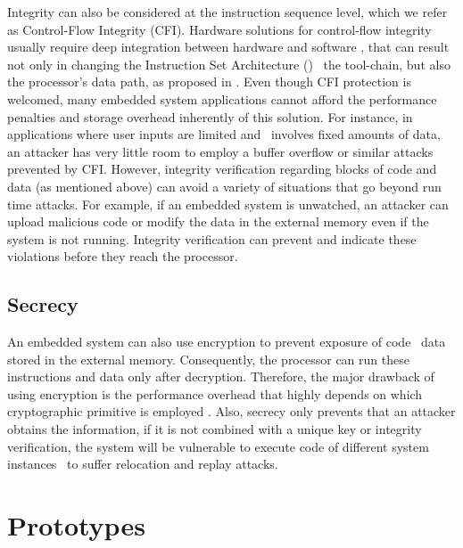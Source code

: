Integrity can also be considered at the instruction sequence level, which we refer as Control-Flow Integrity (CFI). Hardware solutions for control-flow integrity usually require deep integration between hardware and software \cite{Davi2015:HAFIX}, that can result not only in changing the Instruction Set Architecture (\isa) \andor~the tool-chain, but also the processor's data path, as proposed in \cite{Gelbart2005:CODESSEAL, Kanuparthi2012:DynamicIntegrity}. Even though CFI protection is welcomed, many embedded system applications cannot afford the performance penalties and storage overhead inherently of this solution. For instance, in applications where user inputs are limited and \io~involves fixed amounts of data, an attacker has very little room to employ a buffer overflow or similar attacks prevented by CFI. However, integrity verification regarding blocks of code and data (as mentioned above) can avoid a variety of situations that go beyond run time attacks. For example, if an embedded system is unwatched, an attacker can upload malicious code or modify the data in the external memory even if the system is not running. Integrity verification can prevent and indicate these violations before they reach the processor.


\subsection{Secrecy}
\label{subsec:Secrecy}

An embedded system can also use encryption to prevent exposure of code \andor~data stored in the external memory. Consequently, the processor can run these instructions and data only after decryption. Therefore, the major drawback of using encryption is the performance overhead that highly depends on which cryptographic primitive is employed \cite{Suh2007:PUFs}. Also, secrecy only prevents that an attacker obtains the information, if it is not combined with a unique key or integrity verification, the system will be vulnerable to execute code of different system instances \andor~to suffer  relocation and replay attacks\cite{Elbaz2009}.


\section{Prototypes}



